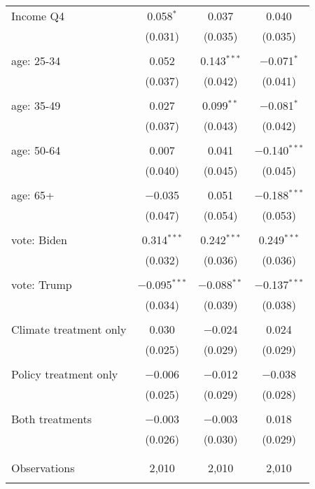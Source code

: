 \begin{tabular}{@{\extracolsep{5pt}}lccc}
 Income Q4 & 0.058$^{*}$ & 0.037 & 0.040 \\ 
  & (0.031) & (0.035) & (0.035) \\ 
  & & & \\ 
 age: 25-34 & 0.052 & 0.143$^{***}$ & $-$0.071$^{*}$ \\ 
  & (0.037) & (0.042) & (0.041) \\ 
  & & & \\ 
 age: 35-49 & 0.027 & 0.099$^{**}$ & $-$0.081$^{*}$ \\ 
  & (0.037) & (0.043) & (0.042) \\ 
  & & & \\ 
 age: 50-64 & 0.007 & 0.041 & $-$0.140$^{***}$ \\ 
  & (0.040) & (0.045) & (0.045) \\ 
  & & & \\ 
 age: 65+ & $-$0.035 & 0.051 & $-$0.188$^{***}$ \\ 
  & (0.047) & (0.054) & (0.053) \\ 
  & & & \\ 
 vote: Biden & 0.314$^{***}$ & 0.242$^{***}$ & 0.249$^{***}$ \\ 
  & (0.032) & (0.036) & (0.036) \\ 
  & & & \\ 
 vote: Trump & $-$0.095$^{***}$ & $-$0.088$^{**}$ & $-$0.137$^{***}$ \\ 
  & (0.034) & (0.039) & (0.038) \\ 
  & & & \\ 
 Climate treatment only & 0.030 & $-$0.024 & 0.024 \\ 
  & (0.025) & (0.029) & (0.029) \\ 
  & & & \\ 
 Policy treatment only & $-$0.006 & $-$0.012 & $-$0.038 \\ 
  & (0.025) & (0.029) & (0.028) \\ 
  & & & \\ 
 Both treatments & $-$0.003 & $-$0.003 & 0.018 \\ 
  & (0.026) & (0.030) & (0.029) \\ 
  & & & \\ 
\hline \\[-1.8ex] 

Observations & 2,010 & 2,010 & 2,010 \\ 
\hline 
\hline \\[-1.8ex] 
\end{tabular} 
